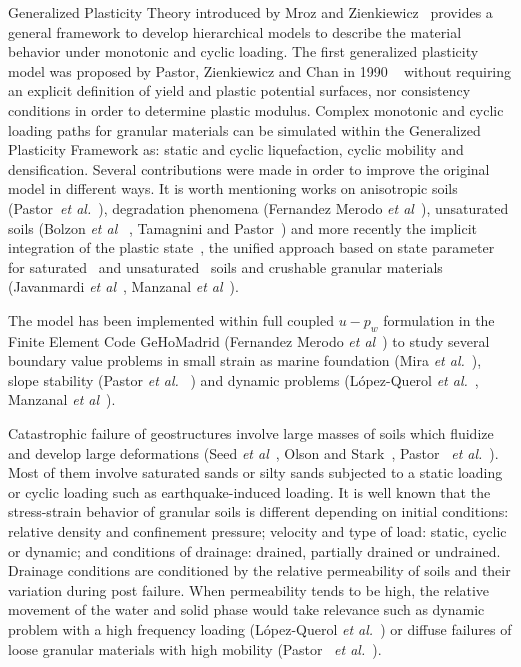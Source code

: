 \documentclass[preprint,12pt,a4paper]{elsarticle}
\begin{document}
Generalized Plasticity Theory introduced by Mroz and Zienkiewicz~\cite{Mroz_Zk84} provides a general framework to develop hierarchical models to describe the material behavior under monotonic and cyclic loading. The first generalized plasticity model was proposed by Pastor, Zienkiewicz and Chan in 1990 ~\cite{PastorZC:90} without requiring an explicit definition of yield and plastic potential surfaces, nor consistency conditions in order to determine plastic modulus. Complex monotonic and cyclic loading paths for granular materials can be simulated within the Generalized Plasticity Framework as: static and cyclic liquefaction, cyclic mobility and densification. Several contributions were made in order to improve the original model in different ways. It is worth mentioning works on anisotropic soils (Pastor~\textit{et al.}~\cite{Pastor92}), degradation phenomena (Fernandez Merodo \textit{et al}~\cite{FernandezMerodo2004}), unsaturated soils (Bolzon \textit{et al }~\cite{Bolzon96}, Tamagnini and Pastor~\cite{Tamagnini04}) and more recently the implicit integration of the plastic state~\cite{Mira2009}, the unified approach based on state parameter for saturated~\cite{Manzanal2011} and unsaturated~\cite{Manzanal2011a} soils and crushable granular materials (Javanmardi \textit{et al}~\cite{Javanmardi2018}, Manzanal \textit{et al}~\cite{Manzanal2015, Manzanal2019}).

The model has been implemented within  full coupled  $u-p_w$ formulation in the Finite Element Code GeHoMadrid (Fernandez Merodo \textit{et al}~\cite{FernandezMerodo2004}) to study several boundary value problems in small strain as marine foundation (Mira \textit{et al.}~\cite{Mira18}), slope stability (Pastor \textit{et al. }~\cite{Pastor09,Pastor11}) and dynamic problems (L\'opez-Querol \textit{et al.}~\cite{LopezQuerol2008}, Manzanal \textit{et al}~\cite{Manzanal2019b}). 

Catastrophic failure of geostructures involve large masses of soils which fluidize and develop large deformations (Seed \textit{et al}~\cite{Seed75}, Olson and Stark~\cite{Olson02}, Pastor~\textit{ et al.}~\cite{Pastor09}). Most of them involve saturated sands or silty sands subjected to a static loading or cyclic loading such as earthquake-induced loading. It is well known that the stress-strain behavior of granular soils is different depending on initial conditions: relative density and confinement pressure; velocity and type of load: static, cyclic or dynamic; and conditions of drainage: drained, partially drained or undrained. Drainage conditions are conditioned by the relative permeability of soils and their variation during post failure. When permeability tends to be high, the relative movement of the water and solid phase would take relevance such as dynamic problem with a high frequency loading (L\'opez-Querol \textit{et al.}~\cite{LopezQuerol2008}) or diffuse failures of loose granular materials with high mobility (Pastor~\textit{ et al.}~\cite{Pastor09}). 
\end{document}
